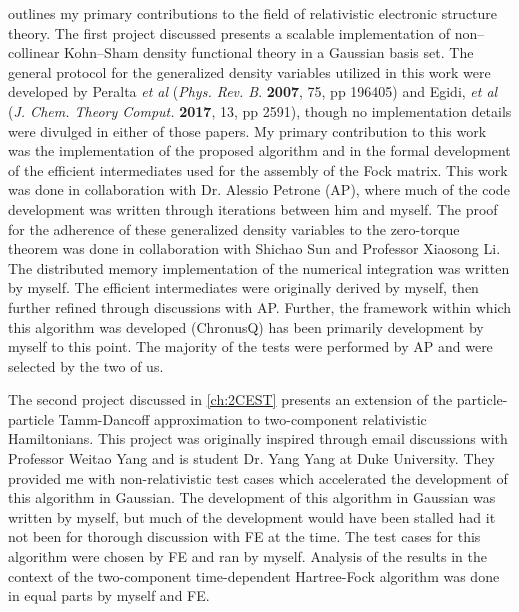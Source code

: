 {   outlines my primary contributions to the field of relativistic electronic structure theory.
  The first project discussed presents a scalable implementation of non--collinear Kohn--Sham density
  functional theory in a Gaussian basis set. The general protocol for the generalized density variables
  utilized in this work were developed by Peralta \emph{et al} (\emph{Phys. Rev. B}. {\bf 2007}, 75, pp 196405) 
  and Egidi, \emph{et al} (\emph{J. Chem. Theory Comput.} {\bf 2017}, 13, pp 2591),
  though no implementation details were divulged in either of those papers. My primary contribution to this
  work was the implementation of the proposed algorithm and in the formal development of the efficient
  intermediates used for the assembly of the Fock matrix. This work was done in collaboration with Dr. Alessio
  Petrone (AP), where much of the code development was written through iterations between him and myself. The
  proof for the adherence of these generalized density variables to the zero-torque theorem was done in 
  collaboration with Shichao Sun and Professor Xiaosong Li. The distributed memory implementation of the numerical integration
  was written by myself. The efficient intermediates were originally derived by myself, then further refined
  through discussions with AP. Further, the framework within which this algorithm was developed 
  (ChronusQ) has been primarily development by myself to this point. The majority of the tests were
  performed by AP and were selected by the two of us.

  The second project discussed in \cref{ch:2CEST} presents an extension of the particle-particle Tamm-Dancoff
  approximation to two-component relativistic Hamiltonians. This project was originally inspired through 
  email discussions with Professor Weitao Yang and is student Dr. Yang Yang at Duke University. They provided
  me with non-relativistic test cases which accelerated the development of this algorithm in Gaussian. The
  development of this algorithm in Gaussian was written by myself, but much of the development would have 
  been stalled had it not been for thorough discussion with FE at the time. The test cases for
  this algorithm were chosen by FE and ran by myself. Analysis of the results in the context of the
  two-component time-dependent Hartree-Fock algorithm was done in equal parts by myself and FE.

}
